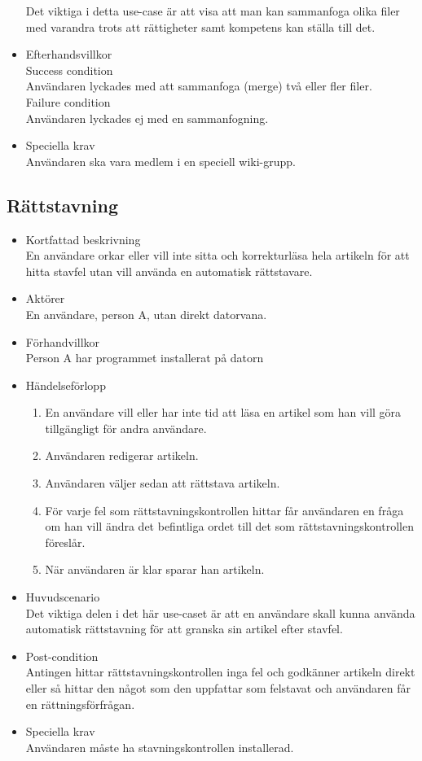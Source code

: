 \begin{itemize}
	Det viktiga i detta use-case är att visa att man kan sammanfoga olika filer med varandra trots att rättigheter samt kompetens kan ställa till det.
	\item Efterhandsvillkor	
		\\Success condition 
		\\Användaren lyckades med att sammanfoga (merge) två eller fler filer.
		\\Failure condition
		\\Användaren lyckades ej med en sammanfogning.
		
	\item Speciella krav
	\\Användaren ska vara medlem i en speciell wiki-grupp.
\end{itemize}

\subsection{Rättstavning}
\begin{itemize}
	\item Kortfattad beskrivning
	\\En användare orkar eller vill inte sitta och korrekturläsa hela artikeln för att hitta stavfel utan vill använda en automatisk rättstavare.
	\item Aktörer
	\\En användare, person A, utan direkt datorvana.
	\item Förhandvillkor
	\\Person A har programmet installerat på datorn
	\item Händelseförlopp
	\begin{enumerate}
		\item En användare vill eller har inte tid att läsa en artikel som han vill göra tillgängligt för andra användare.
		\item Användaren redigerar artikeln.
		\item Användaren väljer sedan att rättstava artikeln.
		\item För varje fel som rättstavningskontrollen hittar får användaren en fråga om han vill ändra det befintliga ordet till det som rättstavningskontrollen föreslår.
		\item När användaren är klar sparar han artikeln.
	\end{enumerate}
	\item Huvudscenario
	\\Det viktiga delen i det här use-caset är att en användare skall kunna använda automatisk rättstavning för att granska sin artikel efter stavfel.
	\item Post-condition
	\\ Antingen hittar rättstavningskontrollen inga fel och godkänner artikeln direkt eller så hittar den något som den uppfattar som felstavat och användaren får en rättningsförfrågan.
	\item Speciella krav
	\\Användaren måste ha stavningskontrollen installerad.
\end{itemize}

